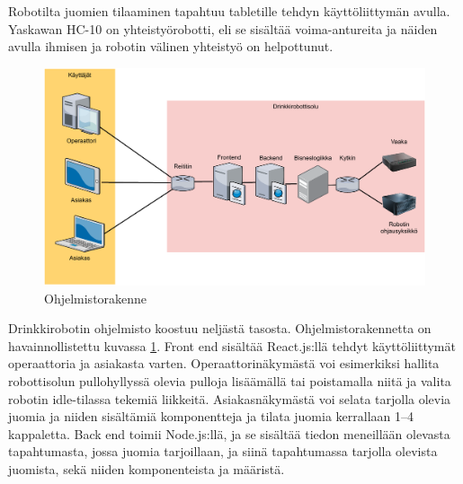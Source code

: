 Robotilta juomien tilaaminen tapahtuu tabletille tehdyn käyttöliittymän avulla. Yaskawan HC-10 on yhteistyörobotti, eli se sisältää voima-antureita ja näiden avulla ihmisen ja robotin välinen yhteistyö on helpottunut. \cite{Pullonkaula2020}

\begin{figure}[h]
\begin{center}
\includegraphics[scale=0.6]{img/rakenne.pdf}
\end{center}
\caption{Ohjelmistorakenne \cite[s. 11]{Kemppi2021}}
\label{fig:rakenne}
\end{figure}

Drinkkirobotin ohjelmisto koostuu neljästä tasosta. Ohjelmistorakennetta on havainnollistettu kuvassa \ref{fig:rakenne}. Front end sisältää React.js:llä tehdyt käyttöliittymät operaattoria ja asiakasta varten. Operaattorinäkymästä voi esimerkiksi hallita robottisolun pullohyllyssä olevia pulloja lisäämällä tai poistamalla niitä ja valita robotin idle\hyp{}tilassa tekemiä liikkeitä. Asiakasnäkymästä voi selata tarjolla olevia juomia ja niiden sisältämiä komponentteja ja tilata juomia kerrallaan 1--4 kappaletta. Back end toimii Node.js:llä, ja se sisältää tiedon meneillään olevasta tapahtumasta, jossa juomia tarjoillaan, ja siinä tapahtumassa tarjolla olevista juomista, sekä niiden komponenteista ja määristä.

